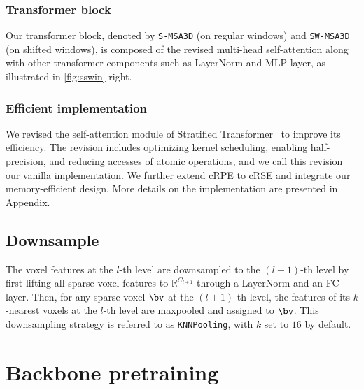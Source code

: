 \documentclass[10pt,twocolumn,letterpaper]{article}
\begin{document}
\subsubsection{Transformer block} Our {\SST} transformer block, denoted by \texttt{S-MSA3D} (on regular windows) and \texttt{SW-MSA3D} (on shifted windows), is composed of the revised multi-head self-attention along with other transformer components such as LayerNorm and MLP layer, as illustrated in \cref{fig:sswin}-right.


\subsubsection{Efficient implementation} \label{subsec:efficent}
We revised the self-attention module of Stratified Transformer~\cite{lai2022stratified} to improve its efficiency. The revision includes optimizing kernel scheduling, enabling half-precision, and reducing accesses of atomic operations, and we call this revision our vanilla implementation. We further extend cRPE to cRSE and integrate our memory-efficient design.  More details on the implementation are presented in Appendix.


\subsection{Downsample} \label{subsec:downsample}
The voxel features at the $l$-th level are downsampled to the $(l+1)$-th level by first lifting all sparse voxel features to $\mathbb{R}^{C_{l+1}}$ through a LayerNorm and an FC layer. Then, for any sparse voxel $\bv$ at the $(l+1)$-th level, the features of its $k$-nearest voxels at the $l$-th level are maxpooled and assigned to $\bv$. This downsampling strategy is referred to as \texttt{KNNPooling}, with $k$ set to $16$ by default.

\section{{\SST} Backbone pretraining}
\end{document}
